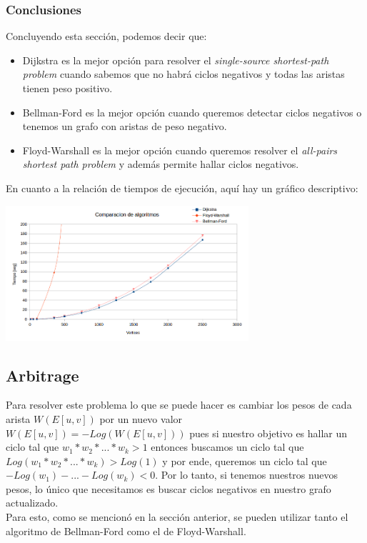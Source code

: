 \documentclass{article}
\newcommand\tab[1][0.5cm]{\hspace*{#1}}
\begin{document}
            \subsubsection{Conclusiones}
            \tab Concluyendo esta sección, podemos decir que:
            \begin{itemize}
                \item Dijkstra es la mejor opción para resolver el \emph{single-source shortest-path problem}
                cuando sabemos que no habrá ciclos negativos y todas las aristas tienen peso positivo.
                \item Bellman-Ford es la mejor opción cuando queremos detectar ciclos negativos o tenemos un
                grafo con aristas de peso negativo.
                \item Floyd-Warshall es la mejor opción cuando queremos resolver el \emph{all-pairs shortest path problem}
                y además permite hallar ciclos negativos.
            \end{itemize}
            \tab En cuanto a la relación de tiempos de ejecución, aquí hay un gráfico descriptivo:
            \begin{center}
                \includegraphics[width=9cm, height=5cm]{images/ComparacionAlgoritmos}
            \end{center}

        \subsection{Arbitrage}
            \tab Para resolver este problema lo que se puede hacer es cambiar los pesos de cada arista $W(E[u, v])$
            por un nuevo valor $W(E[u, v]) = -Log(W(E[u, v]))$ pues si nuestro objetivo es hallar un ciclo tal que
            $w_{1}*w_{2}*...*w_{k} > 1$ entonces buscamos un ciclo tal que $Log(w_{1}*w_{2}*...*w_{k}) > Log(1)$
            y por ende, queremos un ciclo tal que $-Log(w_{1}) - ... - Log(w_{k}) < 0$. Por lo tanto, si tenemos
            nuestros nuevos pesos, lo único que necesitamos es buscar ciclos negativos en nuestro grafo actualizado. \\
            \tab Para esto, como se mencionó en la sección anterior, se pueden utilizar tanto el algoritmo de
            Bellman-Ford como el de Floyd-Warshall.
\end{document}
